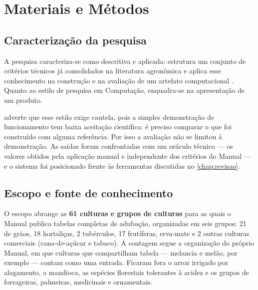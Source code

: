 %

\chapter{Materiais e Métodos}\label{chap:metodologia}

\section{Caracterização da pesquisa}

A pesquisa caracteriza-se como descritiva e aplicada: estrutura um conjunto de critérios
técnicos já consolidados na literatura agronômica e aplica esse conhecimento na
construção e na avaliação de um artefato computacional \citep{Wazlawick2014}. Quanto ao
estilo de pesquisa em Computação, enquadra-se na apresentação de um produto.

\cite{Wazlawick2014} adverte que esse estilo exige cautela, pois a simples demonstração
de funcionamento tem baixa aceitação científica: é preciso comparar o que foi construído
com alguma referência. Por isso a avaliação não se limitou à demonstração. As saídas
foram confrontadas com um oráculo técnico --- os valores obtidos pela aplicação manual e
independente dos critérios do Manual \citep{ManualCalagem2016} --- e o sistema foi
posicionado frente às ferramentas discutidas no \cref{chap:revisao}.

\section{Escopo e fonte de conhecimento}

O escopo abrange as \textbf{61 culturas e grupos de culturas} para as quais o Manual
publica tabelas completas de adubação, organizadas em seis grupos: 21 de grãos, 18
hortaliças, 2 tubérculos, 17 frutíferas, erva-mate e 2 outras culturas comerciais
(cana-de-açúcar e tabaco). A contagem segue a organização do próprio Manual, em que
culturas que compartilham tabela --- melancia e melão, por exemplo --- contam como uma
entrada. Ficaram fora o arroz irrigado por alagamento, a mandioca, as espécies
florestais tolerantes à acidez e os grupos de forrageiras, palmeiras, medicinais e
ornamentais.


